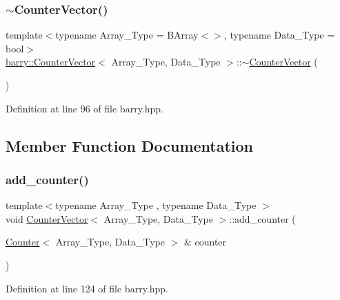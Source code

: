 \subsubsection{\texorpdfstring{$\sim$\+Counter\+Vector()}{~CounterVector()}}
{\footnotesize\ttfamily template$<$typename Array\+\_\+\+Type  = B\+Array$<$$>$, typename Data\+\_\+\+Type  = bool$>$ \\
\hyperlink{classbarry_1_1_counter_vector}{barry\+::\+Counter\+Vector}$<$ Array\+\_\+\+Type, Data\+\_\+\+Type $>$\+::$\sim$\hyperlink{classbarry_1_1_counter_vector}{Counter\+Vector} (\begin{DoxyParamCaption}{ }\end{DoxyParamCaption})\hspace{0.3cm}{\ttfamily [inline]}}



Definition at line 96 of file barry.\+hpp.



\subsection{Member Function Documentation}
\mbox{\label{classbarry_1_1_counter_vector_a34fda06ff678691daf3b0455c1a2af48}} 
\subsubsection{\texorpdfstring{add\+\_\+counter()}{add\_counter()}\hspace{0.1cm}{\footnotesize\ttfamily [1/3]}}
{\footnotesize\ttfamily template$<$typename Array\+\_\+\+Type , typename Data\+\_\+\+Type $>$ \\
void \hyperlink{classbarry_1_1_counter_vector}{Counter\+Vector}$<$ Array\+\_\+\+Type, Data\+\_\+\+Type $>$\+::add\+\_\+counter (\begin{DoxyParamCaption}\item[{\hyperlink{classbarry_1_1_counter}{Counter}$<$ Array\+\_\+\+Type, Data\+\_\+\+Type $>$ \&}]{counter }\end{DoxyParamCaption})\hspace{0.3cm}{\ttfamily [inline]}}



Definition at line 124 of file barry.\+hpp.

